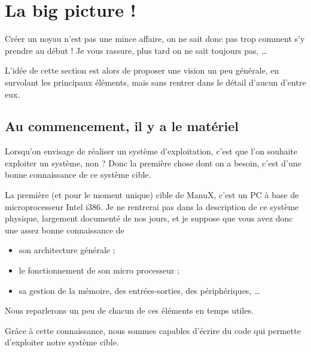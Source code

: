 %
\section{La big picture !}

   Créer un noyau n'est pas une mince affaire, on ne sait donc pas
trop comment s'y prendre au début ! Je vous rassure, plus tard on ne
sait toujours pas, \ldots


   L’idée de cette section est alors de proposer une vision un peu
générale, en survolant les principaux éléments, mais sans rentrer dans
le détail d'aucun d'entre eux.

%
\subsection{Au commencement, il y a le matériel}

   Lorsqu'on envisage de réaliser un système d’exploitation, c'est que
l'on souhaite exploiter un système, non ? Donc la  première chose dont
on a besoin, c'est d'une bonne connaissance de ce système cible.

   La première (et pour le moment unique) cible de ManuX, c'est un PC
à base de microprocesseur Intel i386. Je ne rentrerai pas dans la
description de ce système physique, largement documenté de nos jours,
et je suppose que vous avez donc une assez bonne connaissance de

\begin{itemize}
   \item son architecture générale ;
   \item le fonctionnement de son micro processeur ;
   \item sa gestion de la mémoire, des entrées-sorties, des
     périphériques, \ldots
\end{itemize}

   Nous reparlerons un peu de chacun de ces éléments en temps utiles.

   Grâce à cette connaissance, nous sommes capables d'écrire du code
qui permette d'exploiter notre système cible.
   
%
